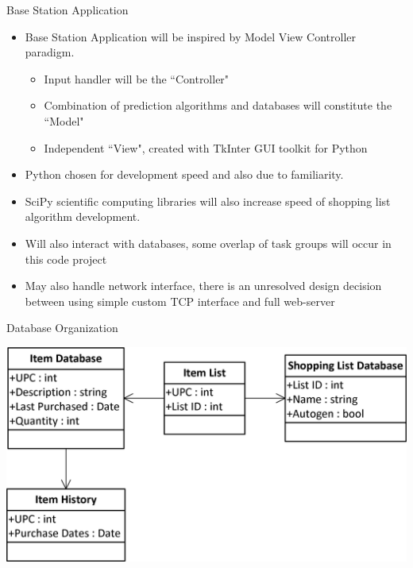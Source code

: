 \documentclass[t]{beamer}
\begin{document}
\begin{frame}{Base Station Application}
\begin{itemize}
\item Base Station Application will be inspired by Model View Controller paradigm.
\begin{itemize}
\item Input handler will be the ``Controller"
\item Combination of prediction algorithms and databases will constitute the ``Model"
\item Independent ``View", created with TkInter GUI toolkit for Python
\end{itemize}
\item Python chosen for development speed and also due to familiarity.
\item SciPy scientific computing libraries will also increase speed of shopping list algorithm development.
\item Will also interact with databases, some overlap of task groups will occur in this code project
\item May also handle network interface, there is an unresolved design decision between using simple custom TCP interface and full web-server
\end{itemize}
\end{frame}

\begin{frame}{Database Organization}
\begin{center}
\includegraphics[scale=1.0]{../Graphics/Databases}
\end{center}
\end{frame}
\end{document}
